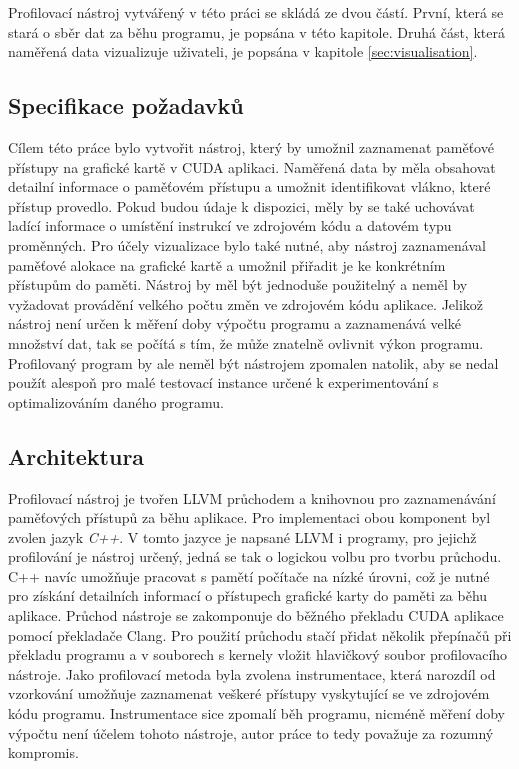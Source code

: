 Profilovací nástroj vytvářený v této práci se skládá ze dvou částí. První, která se stará o sběr dat za běhu programu, je popsána v této kapitole. Druhá část, která naměřená data vizualizuje uživateli, je popsána v kapitole \ref{sec:visualisation}.

\subsection{Specifikace požadavků}
Cílem této práce bylo vytvořit nástroj, který by umožnil zaznamenat paměťové přístupy na grafické kartě v CUDA aplikaci. Naměřená data by měla obsahovat detailní informace o paměťovém přístupu a umožnit identifikovat vlákno, které přístup provedlo. Pokud budou údaje k dispozici, měly by se také uchovávat ladící informace o umístění instrukcí ve zdrojovém kódu a datovém typu proměnných.
Pro účely vizualizace bylo také nutné, aby nástroj zaznamenával paměťové alokace na grafické kartě a umožnil přiřadit je ke konkrétním přístupům do paměti.
Nástroj by měl být jednoduše použitelný a neměl by vyžadovat provádění velkého počtu změn ve zdrojovém kódu aplikace. Jelikož nástroj není určen k měření doby výpočtu programu a zaznamenává velké množství dat, tak se počítá s tím, že může znatelně ovlivnit výkon programu. Profilovaný program by ale neměl být nástrojem zpomalen natolik, aby se nedal použít alespoň pro malé testovací instance určené k experimentování s optimalizováním daného programu.

\subsection{Architektura}
Profilovací nástroj je tvořen LLVM průchodem a knihovnou pro zaznamenávání paměťových přístupů za běhu aplikace. Pro implementaci obou komponent byl zvolen jazyk \emph{C++}. V tomto jazyce je napsané LLVM i programy, pro jejichž profilování je nástroj určený, jedná se tak o logickou volbu pro tvorbu průchodu. C++ navíc umožňuje pracovat s pamětí počítače na nízké úrovni, což je nutné pro získání detailních informací o přístupech grafické karty do paměti za běhu aplikace.
Průchod nástroje se zakomponuje do běžného překladu CUDA aplikace pomocí překladače Clang. Pro použití průchodu stačí přidat několik přepínačů při překladu programu a v souborech s kernely vložit hlavičkový soubor profilovacího nástroje. 
Jako profilovací metoda byla zvolena instrumentace, která narozdíl od vzorkování umožňuje zaznamenat veškeré přístupy vyskytující se ve zdrojovém kódu programu. Instrumentace sice zpomalí běh programu, nicméně měření doby výpočtu není účelem tohoto nástroje, autor práce to tedy považuje za rozumný kompromis.

